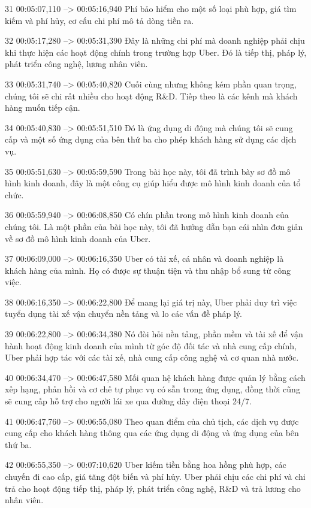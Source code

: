 31
00:05:07,110 --> 00:05:16,940
Phí bảo hiểm cho một số loại phù hợp, giá tìm kiếm và phí hủy, cơ cấu chi phí mô tả dòng tiền ra.

32
00:05:17,280 --> 00:05:31,390
Đây là những chi phí mà doanh nghiệp phải chịu khi thực hiện các hoạt động chính trong trường hợp Uber.  Đó là tiếp thị, pháp lý, phát triển công nghệ, lương nhân viên.

33
00:05:31,740 --> 00:05:40,820
Cuối cùng nhưng không kém phần quan trọng, chúng tôi sẽ chi rất nhiều cho hoạt động R&D.  Tiếp theo là các kênh mà khách hàng muốn tiếp cận.

34
00:05:40,830 --> 00:05:51,510
Đó là ứng dụng di động mà chúng tôi sẽ cung cấp và một số ứng dụng của bên thứ ba cho phép khách hàng sử dụng các dịch vụ.

35
00:05:51,630 --> 00:05:59,590
Trong bài học này, tôi đã trình bày sơ đồ mô hình kinh doanh, đây là một công cụ giúp hiểu được mô hình kinh doanh của tổ chức.

36
00:05:59,940 --> 00:06:08,850
Có chín phần trong mô hình kinh doanh của chúng tôi.  Là một phần của bài học này, tôi đã hướng dẫn bạn cái nhìn đơn giản về sơ đồ mô hình kinh doanh của Uber.

37
00:06:09,000 --> 00:06:16,350
Uber có tài xế, cá nhân và doanh nghiệp là khách hàng của mình.  Họ có được sự thuận tiện và thu nhập bổ sung từ công việc.

38
00:06:16,350 --> 00:06:22,800
Để mang lại giá trị này, Uber phải duy trì việc tuyển dụng tài xế vận chuyển nền tảng và lo các vấn đề pháp lý.

39
00:06:22,800 --> 00:06:34,380
Nó đòi hỏi nền tảng, phần mềm và tài xế để vận hành hoạt động kinh doanh của mình từ góc độ đối tác và nhà cung cấp chính, Uber phải hợp tác với các tài xế, nhà cung cấp công nghệ và cơ quan nhà nước.

40
00:06:34,470 --> 00:06:47,580
Mối quan hệ khách hàng được quản lý bằng cách xếp hạng, phản hồi và cơ chế tự phục vụ có sẵn trong ứng dụng, đồng thời cũng sẽ cung cấp hỗ trợ cho người lái xe qua đường dây điện thoại 24/7.

41
00:06:47,760 --> 00:06:55,080
Theo quan điểm của chủ tịch, các dịch vụ được cung cấp cho khách hàng thông qua các ứng dụng di động và ứng dụng của bên thứ ba.

42
00:06:55,350 --> 00:07:10,620
Uber kiếm tiền bằng hoa hồng phù hợp, các chuyến đi cao cấp, giá tăng đột biến và phí hủy.  Uber phải chịu các chi phí và chi trả cho hoạt động tiếp thị, pháp lý, phát triển công nghệ, R&D và trả lương cho nhân viên.

